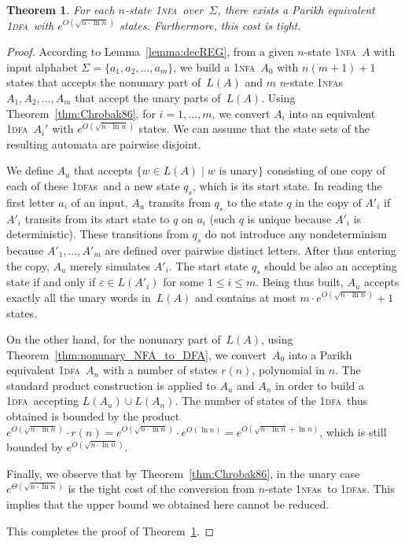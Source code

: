 \documentclass[11pt]{article}
\newcommand*{\ow}{\textsc{1}}
\newcommand*{\owdfa}{\ow\textsc{dfa}}
\newcommand*{\owdfas}{\ow\textsc{dfa}s}
\newcommand*{\ownfa}{\ow\textsc{nfa}}
\newcommand*{\ownfas}{\ow\textsc{nfa}s}
\newtheorem{theorem}{Theorem}[section]
\begin{document}
\begin{theorem}\label{thm:NFA_to_DFA}
	For each $n$-state \ownfa\ over~$\Sigma$, there exists a Parikh equivalent \owdfa\ with $e^{O(\sqrt{n \cdot \ln n})}$ states. 
	Furthermore, this cost is tight. 
\end{theorem}
\begin{proof}
According to Lemma~\ref{lemma:decREG}, {}from a given $n$-state \ownfa\ $A$ with input alphabet 
$\Sigma = \{a_1, a_2, \ldots, a_m\}$, we build a \ownfa\ $A_0$ with $n(m+1)+1$ states that accepts
the nonunary part of~$L(A)$ and $m$ $n$-state \ownfas\ $A_1,A_2,\ldots,A_m$ that accept the unary parts
of~$L(A)$.
Using Theorem~\ref{thm:Chrobak86}, for $i=1,\ldots,m$, we convert $A_i$ into an equivalent 
\owdfa\ $A_i'$ with $e^{O(\sqrt{n \cdot \ln n})}$ states. We can assume that the state sets of the resulting automata are
  pairwise disjoint.
  
  We define $A_u$ that accepts $\{w \in L(A) \mid \mbox{$w$ is unary}\}$
  consisting of one copy of each of these \owdfas\ and a new state $q_s$, which is its start state.
  In reading the first letter $a_i$ of an input, $A_u$ transits {}from $q_s$ to the state $q$ in the 
  copy of $A'_i$ if $A'_i$ transits {}from its start state to $q$ on $a_i$ (such $q$ is unique because $A'_i$ 
  is deterministic). These transitions {}from $q_s$ do not introduce any nondeterminism because 
  $A'_1, \ldots, A'_m$ are defined over pairwise distinct letters. 
	After thus entering the copy, $A_u$ merely simulates $A'_i$. 
	The start state $q_s$ should be also an accepting state if and only if $\varepsilon \in L(A'_i)$ for some 
	$1 \le i \le m$.  
Being thus built, $A_u$ accepts exactly all the unary words in~$L(A)$ and contains at most 
$m \cdot e^{O(\sqrt{n \cdot \ln n})}+1$ states.
 
On the other hand, for the nonunary part of~$L(A)$, using Theorem~\ref{thm:nonunary_NFA_to_DFA},  we convert~$A_0$
into a Parikh equivalent \owdfa\ $A_n$ with a number of states $r(n)$, polynomial in $n$. 
The standard product construction is applied to $A_u$ and $A_n$ in order to build a \owdfa\ accepting $L(A_u) \cup L(A_n)$. 
The number of states of the \owdfa\ thus obtained is bounded by the product 
$e^{O(\sqrt{n \cdot \ln n})}\cdot r(n) = e^{O(\sqrt{n \cdot \ln n})}\cdot e^{O(\ln n)} = e^{O(\sqrt{n \cdot \ln n}+\ln n)}$, 
which is still bounded by $e^{O(\sqrt{n \cdot \ln n})}$.

Finally, we observe that by Theorem~\ref{thm:Chrobak86}, in the unary case $e^{\Theta(\sqrt{n \cdot \ln n})}$ is the
tight cost of the conversion {}from $n$-state \ownfas\ to \owdfas. This implies that the upper bound we obtained here
cannot be reduced.

This completes the proof of Theorem~\ref{thm:NFA_to_DFA}. 
\end{proof}
\end{document}
